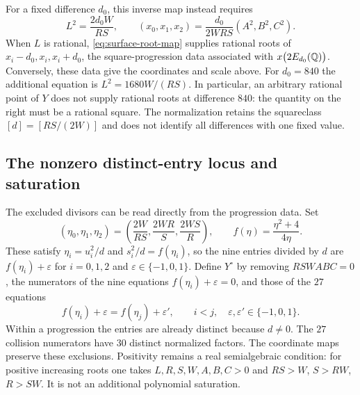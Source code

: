 For a fixed difference $d_0$, this inverse map instead requires
\begin{equation}\label{eq:surface-fixed-scale}
L^2=\frac{2d_0W}{RS},\qquad
(x_0,x_1,x_2)=\frac{d_0}{2WRS}(A^2,B^2,C^2).
\end{equation}
When $L$ is rational, \eqref{eq:surface-root-map} supplies rational roots
of $x_i-d_0,x_i,x_i+d_0$, the square-progression data associated with
$x\bigl(2E_{d_0}(\mathbb{Q})\bigr)$. Conversely, these data give the coordinates
and scale above. For $d_0=840$ the additional equation is
$L^2=1680W/(RS)$. In particular, an arbitrary rational point of $Y$
does not supply rational roots at difference $840$: the quantity on the
right must be a rational square. The normalization retains the
squareclass $[d]=[RS/(2W)]$ and does not identify all differences with one
fixed value.

\subsection{The nonzero distinct-entry locus and saturation}

The excluded divisors can be read directly from the progression data.
Set
\[
(\eta_0,\eta_1,\eta_2)=
\left(\frac{2W}{RS},\frac{2WR}{S},\frac{2WS}{R}\right),
\qquad f(\eta)=\frac{\eta^2+4}{4\eta}.
\]
These satisfy $\eta_i=u_i^2/d$ and $s_i^2/d=f(\eta_i)$, so the nine
entries divided by $d$ are $f(\eta_i)+\varepsilon$ for
$i=0,1,2$ and $\varepsilon\in\{-1,0,1\}$. Define $Y^\circ$ by removing
$RSWABC=0$, the numerators of the nine equations
$f(\eta_i)+\varepsilon=0$, and those of the $27$ equations
\[
f(\eta_i)+\varepsilon=f(\eta_j)+\varepsilon',
\qquad i<j,\quad \varepsilon,\varepsilon'\in\{-1,0,1\}.
\]
Within a progression the entries are already distinct because $d\ne0$.
The $27$ collision numerators have $30$ distinct normalized factors.
The coordinate maps preserve these exclusions.
Positivity remains a real semialgebraic condition: for positive increasing
roots one takes $L,R,S,W,A,B,C>0$ and
$RS>W$, $S>RW$, $R>SW$. It is not an additional polynomial saturation.

